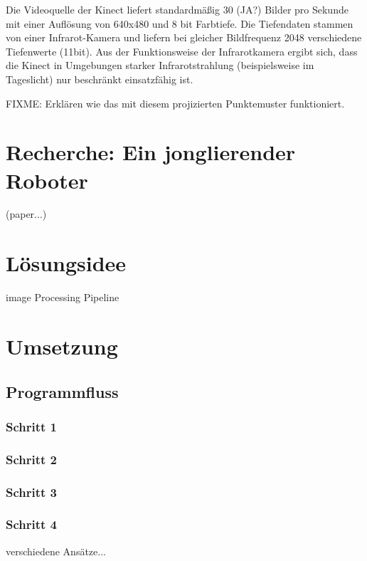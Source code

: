 \documentclass[12pt,a4paper,ngerman]{scrartcl}
\begin{document}
Die Videoquelle der Kinect liefert standardmäßig 30 (JA?) Bilder pro Sekunde mit einer
Auflösung von 640x480 und 8 bit Farbtiefe. Die Tiefendaten stammen von einer 
Infrarot-Kamera und liefern bei gleicher Bildfrequenz 2048 verschiedene 
Tiefenwerte (11bit). Aus der Funktionsweise der Infrarotkamera ergibt sich, dass
die Kinect in Umgebungen starker Infrarotstrahlung (beispielsweise im Tageslicht)
nur beschränkt einsatzfähig ist. 

FIXME: Erklären wie das mit diesem projizierten Punktemuster funktioniert. 

\section{Recherche: Ein jonglierender Roboter} 

(paper...)

\section{Lösungsidee}

image Processing Pipeline

\section{Umsetzung}

\subsection{Programmfluss}

\subsubsection{Schritt 1}

\subsubsection{Schritt 2}

\subsubsection{Schritt 3}

\subsubsection{Schritt 4}

verschiedene Ansätze... 
\end{document}
